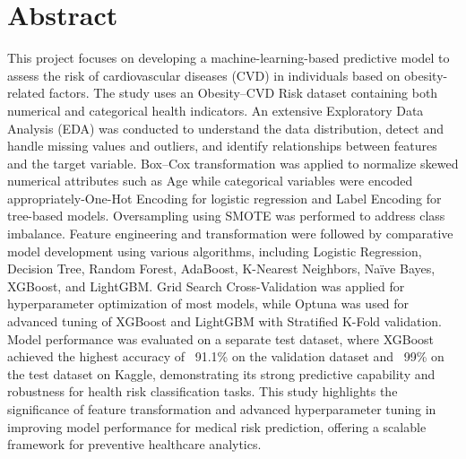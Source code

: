 \chapter{Abstract}\label{ch:abstract}


This project focuses on developing a machine-learning-based predictive model to assess the risk of cardiovascular diseases (CVD) in individuals based on obesity-related factors.
The study uses an Obesity–CVD Risk dataset containing both numerical and categorical health indicators.
An extensive Exploratory Data Analysis (EDA) was conducted to understand the data distribution, detect and handle missing values and outliers, and identify relationships between features and the target variable.
Box–Cox transformation was applied to normalize skewed numerical attributes such as Age while categorical variables were encoded appropriately-One-Hot Encoding for logistic regression and Label Encoding for tree-based models.
Oversampling using SMOTE was performed to address class imbalance.
Feature engineering and transformation were followed by comparative model development using various algorithms, including Logistic Regression, Decision Tree, Random Forest, AdaBoost, K-Nearest Neighbors, Naïve Bayes, XGBoost, and LightGBM. Grid Search Cross-Validation was applied for hyperparameter optimization of most models, while Optuna was used for advanced tuning of XGBoost and LightGBM with Stratified K-Fold validation.
Model performance was evaluated on a separate test dataset, where XGBoost achieved the highest accuracy of ~91.1\% on the validation dataset and ~99\% on the test dataset on Kaggle, demonstrating its strong predictive capability and robustness for health risk classification tasks.
This study highlights the significance of feature transformation and advanced hyperparameter tuning in improving model performance for medical risk prediction, offering a scalable framework for preventive healthcare analytics.
